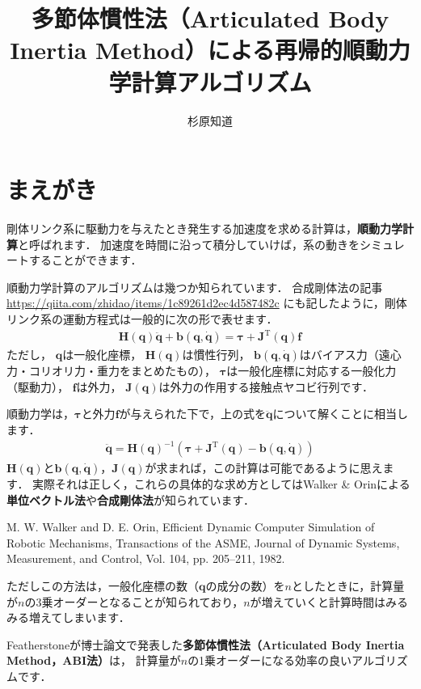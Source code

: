 ﻿\documentclass[a4paper]{jsarticle}
\title{\Large {\bf 多節体慣性法（Articulated Body Inertia Method）による再帰的順動力学計算アルゴリズム}}
\author{杉原知道}
\begin{document}
\maketitle

\section{まえがき}

剛体リンク系に駆動力を与えたとき発生する加速度を求める計算は，{\bf 順動力学計算}と呼ばれます．
加速度を時間に沿って積分していけば，系の動きをシミュレートすることができます．

順動力学計算のアルゴリズムは幾つか知られています．
合成剛体法の記事\url{https://qiita.com/zhidao/items/1c89261d2ec4d587482c}
にも記したように，剛体リンク系の運動方程式は一般的に次の形で表せます．
\begin{align*}
\bm{H}(\bm{q})\ddot{\bm{q}}+\bm{b}(\bm{q},\dot{\bm{q}})=\bm{\tau}+\bm{J}^{\mathrm{T}}(\bm{q})\bm{f}
\end{align*}
ただし，
$\bm{q}$は一般化座標，
$\bm{H}(\bm{q})$は慣性行列，
$\bm{b}(\bm{q},\dot{\bm{q}})$はバイアス力（遠心力・コリオリ力・重力をまとめたもの），
$\bm{\tau}$は一般化座標に対応する一般化力（駆動力），
$\bm{f}$は外力，
$\bm{J}(\bm{q})$は外力の作用する接触点ヤコビ行列です．

順動力学は，$\bm{\tau}$と外力$\bm{f}$が与えられた下で，上の式を$\ddot{\bm{q}}$について解くことに相当します．
\begin{align*}
\ddot{\bm{q}}=\bm{H}(\bm{q})^{-1}\left(\bm{\tau}+\bm{J}^{\mathrm{T}}(\bm{q})-\bm{b}(\bm{q},\dot{\bm{q}})\right)
\end{align*}
$\bm{H}(\bm{q})$と$\bm{b}(\bm{q},\dot{\bm{q}})$，$\bm{J}(\bm{q})$が求まれば，この計算は可能であるように思えます．
実際それは正しく，これらの具体的な求め方としてはWalker {\&} Orinによる{\bf 単位ベクトル法}や{\bf 合成剛体法}が知られています．

M. W. Walker and D. E. Orin, Efficient Dynamic Computer Simulation of Robotic Mechanisms, Transactions of the ASME, Journal of Dynamic Systems, Measurement, and Control, Vol. 104, pp. 205--211, 1982.

ただしこの方法は，一般化座標の数（$\bm{q}$の成分の数）を$n$としたときに，計算量が$n$の3乗オーダーとなることが知られており，$n$が増えていくと計算時間はみるみる増えてしまいます．

Featherstoneが博士論文で発表した{\bf 多節体慣性法（Articulated Body Inertia Method，ABI法）}は，
計算量が$n$の1乗オーダーになる効率の良いアルゴリズムです．
\end{document}
